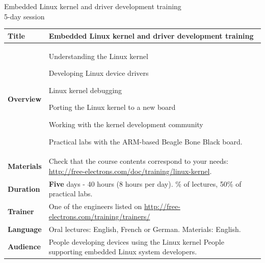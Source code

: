\documentclass[a4paper,12pt,obeyspaces,spaces,hyphens]{article}
\begin{document}
\thispagestyle{fancy}

\setlength{\arrayrulewidth}{0.8pt}

\begin{center}
\LARGE
Embedded Linux kernel and driver development training\\
\large
5-day session
\end{center}
\vspace{1cm}

\small
{}

 {
  \begin{tabularx}{\textwidth}{|g|h|}
    {\bf Title} & {\bf Embedded Linux kernel and driver development training} \\
    \hline

    {\bf Overview} &
    Understanding the Linux kernel \par
    Developing Linux device drivers \par
    Linux kernel debugging \par
    Porting the Linux kernel to a new board \par
    Working with the kernel development community \par
    Practical labs with the ARM-based Beagle Bone Black board. \\
    \hline
    {\bf Materials} &
    Check that the course contents correspond to your needs:
    \newline \url{http://free-electrons.com/doc/training/linux-kernel}. \\
    \hline

    {\bf Duration} & {\bf Five} days - 40 hours (8 hours per day).
    \% of lectures, 50\% of practical labs. \\
    \hline

    {\bf Trainer} & One of the engineers listed on
    \newline \url{http://free-electrons.com/training/trainers/}\\
    \hline

    {\bf Language} & Oral lectures: English, French or German.
    \newline Materials: English.\\
    \hline

    {\bf Audience} & People developing devices using the Linux kernel
    \newline People supporting embedded Linux system developers. \\
    \hline


\end{tabularx}}
\end{document}
